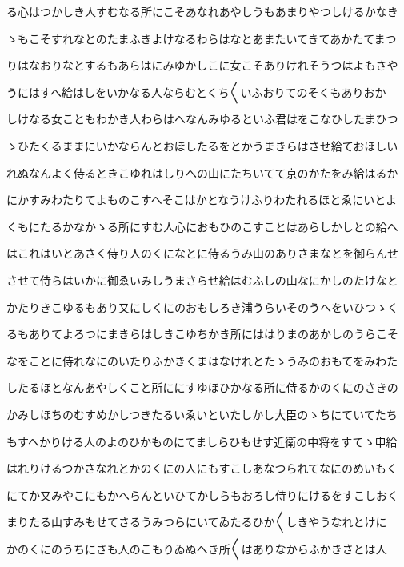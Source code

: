 \documentclass[a4paper,11pt,landscape]{ltjtarticle}
\begin{document}
\par\medskip
る心はつかしき人すむなる所にこそあなれあやしうもあまりやつしけるかなき
\par\medskip
ゝもこそすれなとのたまふきよけなるわらはなとあまたいてきてあかたてまつ
\par\medskip
りはなおりなとするもあらはにみゆかしこに女こそありけれそうつはよもさや
\par\medskip
うにはすへ給はしをいかなる人ならむとくち〱いふおりてのそくもありおか
\par\medskip
しけなる女こともわかき人わらはへなんみゆるといふ君はをこなひしたまひつ
\par\medskip
ゝひたくるままにいかならんとおほしたるをとかうまきらはさせ給ておほしい
\par\medskip
れぬなんよく侍るときこゆれはしりへの山にたちいてて京のかたをみ給はるか
\par\medskip
にかすみわたりてよものこすへそこはかとなうけふりわたれるほとゑにいとよ
\par\medskip
くもにたるかなかゝる所にすむ人心におもひのこすことはあらしかしとの給へ
\par\medskip
はこれはいとあさく侍り人のくになとに侍るうみ山のありさまなとを御らんせ
\par\medskip
させて侍らはいかに御ゑいみしうまさらせ給はむふしの山なにかしのたけなと
\par\medskip
かたりきこゆるもあり又にしくにのおもしろき浦うらいそのうへをいひつゝく
\par\medskip
るもありてよろつにまきらはしきこゆちかき所にははりまのあかしのうらこそ
\par\medskip
なをことに侍れなにのいたりふかきくまはなけれとたゝうみのおもてをみわた
\par\medskip
したるほとなんあやしくこと所ににすゆほひかなる所に侍るかのくにのさきの
\par\medskip
かみしほちのむすめかしつきたるいゑいといたしかし大臣のゝちにていてたち
\par\medskip
もすへかりける人のよのひかものにてましらひもせす近衛の中将をすてゝ申給
\par\medskip
はれりけるつかさなれとかのくにの人にもすこしあなつられてなにのめいもく
\par\medskip
にてか又みやこにもかへらんといひてかしらもおろし侍りにけるをすこしおく
\par\medskip
まりたる山すみもせてさるうみつらにいてゐたるひか〱しきやうなれとけに
\par\medskip
かのくにのうちにさも人のこもりゐぬへき所〱はありなからふかきさとは人
\par\medskip
\end{document}
